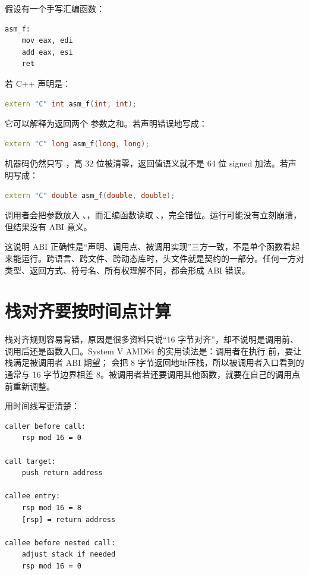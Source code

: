 假设有一个手写汇编函数：

\begin{lstlisting}
asm_f:
    mov eax, edi
    add eax, esi
    ret
\end{lstlisting}

若 C++ 声明是：

\begin{lstlisting}[language=C++]
extern "C" int asm_f(int, int);
\end{lstlisting}

它可以解释为返回两个  参数之和。若声明错误地写成：

\begin{lstlisting}[language=C++]
extern "C" long asm_f(long, long);
\end{lstlisting}

机器码仍然只写 ，高 32 位被清零，返回值语义就不是 64 位 signed 加法。若声明写成：

\begin{lstlisting}[language=C++]
extern "C" double asm_f(double, double);
\end{lstlisting}

调用者会把参数放入 、，而汇编函数读取 、，完全错位。运行可能没有立刻崩溃，但结果没有 ABI 意义。

这说明 ABI 正确性是“声明、调用点、被调用实现”三方一致，不是单个函数看起来能运行。跨语言、跨文件、跨动态库时，头文件就是契约的一部分。任何一方对类型、返回方式、符号名、所有权理解不同，都会形成 ABI 错误。

\section{栈对齐要按时间点计算}

栈对齐规则容易背错，原因是很多资料只说“16 字节对齐”，却不说明是调用前、调用后还是函数入口。System V AMD64 的实用读法是：调用者在执行  前，要让栈满足被调用者 ABI 期望； 会把 8 字节返回地址压栈，所以被调用者入口看到的  通常与 16 字节边界相差 8。被调用者若还要调用其他函数，就要在自己的调用点前重新调整。

用时间线写更清楚：

\begin{lstlisting}
caller before call:
    rsp mod 16 = 0

call target:
    push return address

callee entry:
    rsp mod 16 = 8
    [rsp] = return address

callee before nested call:
    adjust stack if needed
    rsp mod 16 = 0
\end{lstlisting}

